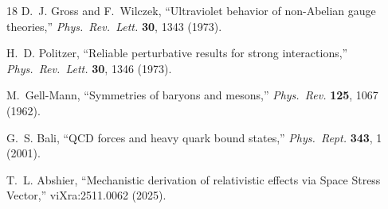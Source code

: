 \documentclass[11pt,a4paper]{article}
\begin{document}
\begin{thebibliography}{18}
D.~J. Gross and F.~Wilczek,
``Ultraviolet behavior of non-Abelian gauge theories,''
\textit{Phys.\ Rev.\ Lett.} \textbf{30}, 1343 (1973).

H.~D. Politzer,
``Reliable perturbative results for strong interactions,''
\textit{Phys.\ Rev.\ Lett.} \textbf{30}, 1346 (1973).

M.~Gell-Mann,
``Symmetries of baryons and mesons,''
\textit{Phys.\ Rev.} \textbf{125}, 1067 (1962).

G.~S. Bali,
``QCD forces and heavy quark bound states,''
\textit{Phys.\ Rept.} \textbf{343}, 1 (2001).

T.~L. Abshier,
``Mechanistic derivation of relativistic effects via Space Stress
Vector,''
viXra:2511.0062 (2025).

\end{thebibliography}
\end{document}
